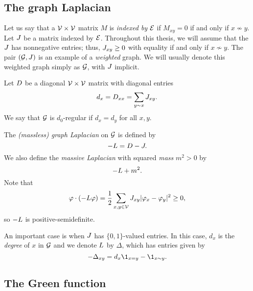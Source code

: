 
\subsection{The graph Laplacian}

Let us say that a $\mathcal{V}\times\mathcal{V}$ matrix $M$ is \emph{indexed by} $\mathcal{E}$
if $M_{xy} = 0$ if and only if $x \not\sim y$.
Let $J$ be a matrix indexed by $\mathcal{E}$.
Throughout this thesis, we will assume that the $J$ has nonnegative entries;
thus, $J_{xy} \ge 0$ with equality if and only if $x\not\sim y$.
The pair $(\mathcal{G}, J)$ is an example of a \emph{weighted} graph.
We will usually denote this weighted graph simply as $\mathcal{G}$, with $J$
implicit.

Let $D$ be a diagonal $\mathcal{V}\times\mathcal{V}$ matrix with diagonal entries
\begin{equation}
d_x = D_{xx} = \sum_{y \sim x} J_{xy}.
\end{equation}
We say that $\mathcal{G}$ is $d_0$-regular if $d_x = d_y$ for all $x, y$.

The \emph{(massless) graph Laplacian} on $\mathcal{G}$ is defined by
\begin{equation}
-L = D - J.
\end{equation}
We also define the \emph{massive Laplacian} with squared \emph{mass} $m^2 > 0$
by
\begin{equation}
-L + m^2.
\end{equation}
Note that
\begin{equation}
\varphi \cdot (-L \varphi)
  =
\frac{1}{2} \sum_{x,y\in\mathcal{V}} J_{xy} |\varphi_x - \varphi_y|^2
  \ge
0,
\end{equation}
so $-L$ is positive-semidefinite.

\begin{example}
An important case is when $J$ has $\{0, 1 \}$-valued entries.
In this case, $d_x$ is the \emph{degree} of $x$ in $\mathcal{G}$ and we denote $L$ by
$\Delta$, which has entries given by
\begin{equation}
-\Delta_{xy} = d_x \1_{x=y} - \1_{x \sim y}.
\end{equation}
\end{example}


\subsection{The Green function}

